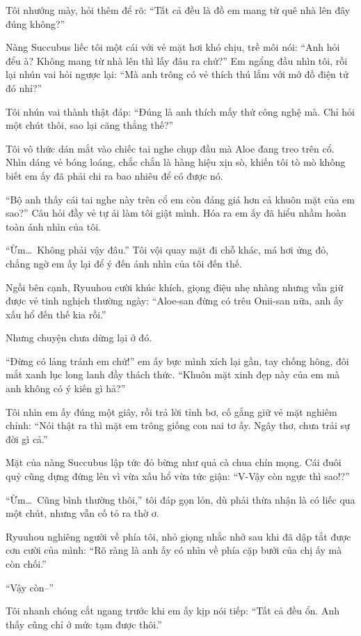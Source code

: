 \documentclass[../main.tex]{subfiles}
\begin{document}
Tôi nhướng mày, hỏi thêm để rõ: ``Tất cả đều là đồ em mang từ quê nhà lên đây đúng không?''

Nàng Succubus liếc tôi một cái với vẻ mặt hơi khó chịu, trề môi nói: ``Anh hỏi đểu à? Không mang từ nhà lên thì lấy đâu ra chứ?'' Em ngẩng đầu nhìn tôi, rồi lại nhún vai hỏi ngược lại: ``Mà anh trông có vẻ thích thú lắm với mớ đồ điện tử đó nhỉ?''

Tôi nhún vai thành thật đáp: ``Đúng là anh thích mấy thứ công nghệ mà. Chỉ hỏi một chút thôi, sao lại căng thẳng thế?''

Tôi vô thức dán mắt vào chiếc tai nghe chụp đầu mà Aloe đang treo trên cổ. Nhìn dáng vẻ bóng loáng, chắc chắn là hàng hiệu xịn sò, khiến tôi tò mò không biết em ấy đã phải chi ra bao nhiêu để có được nó.

``Bộ anh thấy cái tai nghe này trên cổ em còn đáng giá hơn cả khuôn mặt của em sao?'' Câu hỏi đầy vẻ tự ái làm tôi giật mình. Hóa ra em ấy đã hiểu nhầm hoàn toàn ánh nhìn của tôi.

``Ừm\dots\ Không phải vậy đâu.'' Tôi vội quay mặt đi chỗ khác, má hơi ửng đỏ, chẳng ngờ em ấy lại để ý đến ánh nhìn của tôi đến thế.

Ngồi bên cạnh, Ryuuhou cười khúc khích, giọng điệu nhẹ nhàng nhưng vẫn giữ được vẻ tinh nghịch thường ngày: ``Aloe-san đừng có trêu Onii-san nữa, anh ấy xấu hổ đến thế kia rồi.''

Nhưng chuyện chưa dừng lại ở đó.

``Đừng có lảng tránh em chứ!'' em ấy bực mình xích lại gần, tay chống hông, đôi mắt xanh lục long lanh đầy thách thức. ``Khuôn mặt xinh đẹp này của em mà anh không có ý kiến gì hả?''

Tôi nhìn em ấy đúng một giây, rồi trả lời tỉnh bơ, cố gắng giữ vẻ mặt nghiêm chỉnh: ``Nói thật ra thì mặt em trông giống con nai tơ ấy. Ngây thơ, chưa trải sự đời gì cả.''

Mặt của nàng Succubus lập tức đỏ bừng như quả cà chua chín mọng. Cái đuôi quỷ cũng dựng đứng lên vì vừa xấu hổ vừa tức giận: ``V-Vậy còn ngực thì sao!?''

``Ừm\dots\ Cũng bình thường thôi,'' tôi đáp gọn lỏn, dù phải thừa nhận là có liếc qua một chút, nhưng vẫn cố tỏ ra thờ ơ.

Ryuuhou nghiêng người về phía tôi, nhỏ giọng nhắc nhở sau khi đã dập tắt được cơn cười của mình: ``Rõ ràng là anh ấy có nhìn về phía cặp bưởi của chị ấy mà còn chối.''

``Vậy còn--''

Tôi nhanh chóng cắt ngang trước khi em ấy kịp nói tiếp: ``Tất cả đều ổn. Anh thấy cũng chỉ ở mức tạm được thôi.''
\end{document}

